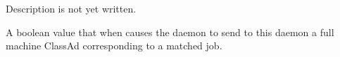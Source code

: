 \begin{description}
\item[\AdAttr{VirtualMemory}:] Description is not yet written.

\item[\AdAttr{WantResAd}:] A boolean value that when 
  causes the  daemon to send to this 
  daemon a full machine ClassAd corresponding to a matched job.

\end{description}

